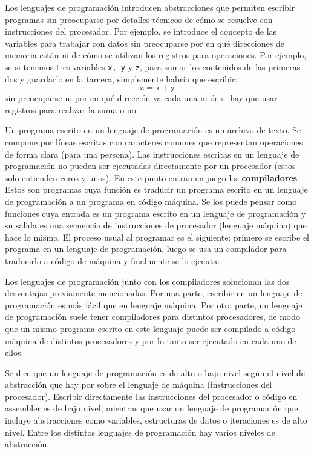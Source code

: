 \documentclass[a4paper, 12pt]{report}
\theoremstyle{definition}
\begin{document}
Los lenguajes de programación introducen abstracciones que permiten escribir programas sin preocuparse por detalles técnicos de cómo se resuelve con instrucciones del procesador. Por ejemplo, se introduce el concepto de las variables para trabajar con datos sin preocuparse por en qué direcciones de memoria están ni de cómo se utilizan los registros para operaciones. Por ejemplo, se si tenemos tres variables {\tt x, y} y {\tt z}, para sumar los contenidos de las primeras dos y guardarlo en la tarcera, simplemente habría que escribir:
$$\mathtt{z} = \mathtt{x}+\mathtt{y}
$$
sin preocuparse ni por en qué dirección va cada una ni de si hay que usar registros para realizar la suma o no.

Un programa escrito en un lenguaje de programación es un archivo de texto. Se compone por líneas escritas con caracteres comunes que representan operaciones de forma clara (para una persona). Las instrucciones escritas en un lenguaje de programación no pueden ser ejecutadas directamente por un procesador (estos solo entienden ceros y unos). En este punto entran en juego los {\bf compiladores}. Estos son programas cuya función es traducir un programa escrito en un lenguaje de programación a un programa en código máquina. Se los puede pensar como funciones cuya entrada es un programa escrito en un lenguaje de programación y su salida es una secuencia de instrucciones de procesador (lenguaje máquina) que hace lo mismo. El proceso usual al programar es el siguiente: primero se escribe el programa en un lenguaje de programación, luego se usa un compilador para traducirlo a código de máquina y finalmente se lo ejecuta.

Los lenguajes de programación junto con los compiladores solucionan las dos desventajas previamente mencionadas. Por una parte, escribir en un lenguaje de programación es más fácil que en lenguaje máquina. Por otra parte, un lenguaje de programación suele tener compiladores para distintos procesadores, de modo que un mismo programa escrito en este lenguaje puede ser compilado a código máquina de distintos procesadores y por lo tanto ser ejecutado en cada uno de ellos.

Se dice que un lenguaje de programación es de alto o bajo nivel según el nivel de abstracción que hay por sobre el lenguaje de máquina (instrucciones del procesador). Escribir directamente las instrucciones del procesador o código en assembler es de bajo nivel, mientras que usar un lenguaje de programación que incluye abstracciones como variables, estructuras de datos o iteraciones es de alto nivel. Entre los distintos lenguajes de programación hay varios niveles de abstracción.
\end{document}
